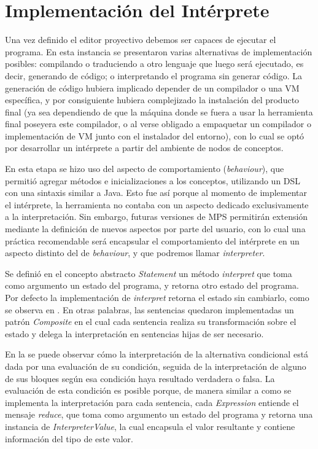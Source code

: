 \section{Implementación del Intérprete}\label{interprete}

Una vez definido el editor proyectivo debemos ser capaces de ejecutar el programa. En esta instancia se presentaron varias alternativas de implementación posibles: compilando o traduciendo a otro lenguaje que luego será ejecutado, es decir, generando de código; o interpretando el programa sin generar código. La generación de código hubiera implicado depender de un compilador o una VM específica, y por consiguiente hubiera complejizado la instalación del producto final (ya sea dependiendo de que la máquina donde se fuera a usar la herramienta final poseyera este compilador, o al verse obligado a empaquetar un compilador o implementación de VM junto con el instalador del entorno), con lo cual se optó por desarrollar un intérprete a partir del ambiente de nodos de conceptos.

En esta etapa se hizo uso del aspecto de comportamiento (\textit{behaviour}), que permitió agregar métodos e inicializaciones a los conceptos, utilizando un DSL con una sintaxis similar a Java. Esto fue así porque al momento de implementar el intérprete, la herramienta no contaba con un aspecto dedicado exclusivamente a la interpretación. Sin embargo, futuras versiones de MPS permitirán extensión mediante la definición de nuevos aspectos por parte del usuario, con lo cual una práctica recomendable será encapsular el comportamiento del intérprete en un aspecto distinto del de \textit{behaviour}, y que podremos llamar \textit{interpreter}.

Se definió en el concepto abstracto \textit{Statement} un método \textit{interpret} que toma como argumento un estado del programa, y retorna otro estado del programa. Por defecto la implementación de \textit{interpret} retorna el estado sin cambiarlo, como se observa en . En otras palabras, las sentencias quedaron implementadas un patrón \textit{Composite} \cite{Gamma} en el cual cada sentencia realiza su transformación sobre el estado y delega la interpretación en sentencias hijas de ser necesario. 


En la  se puede observar cómo la interpretación de la alternativa condicional está dada por una evaluación de su condición, seguida de la interpretación de alguno de sus bloques según esa condición haya resultado verdadera o falsa. La evaluación de esta condición es posible porque, de manera similar a como se implementa la interpretación para cada sentencia, cada \textit{Expression} entiende el mensaje \textit{reduce}, que toma como argumento un estado del programa y retorna una instancia de \textit{InterpreterValue}, la cual encapsula el valor resultante y contiene información del tipo de este valor. 

